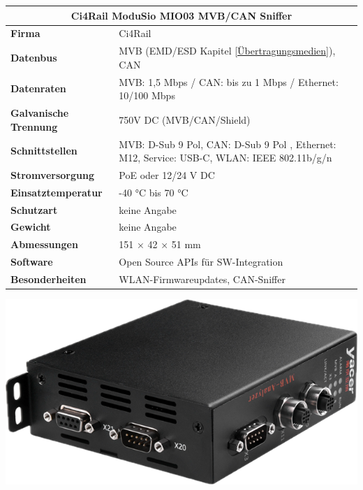 \begin{minipage}{0.57\textwidth}
  \begin{tabular}{|m{3cm}|m{4.5cm}|}
   \hline
   \multicolumn{2}{|c|}{\textbf{Ci4Rail ModuSio MIO03 MVB/CAN Sniffer}} \\ \hline
    \textbf{Firma} & Ci4Rail \\ \hline
    \textbf{Datenbus} & MVB (EMD/ESD Kapitel \ref{Übertragungsmedien}), CAN \\ \hline
    \textbf{Datenraten} & MVB: 1,5 Mbps / CAN: bis zu 1 Mbps / Ethernet: 10/100 Mbps \\ \hline
    \textbf{Galvanische \mbox{Trennung}} & 750V DC (MVB/CAN/Shield) \\ \hline
    \textbf{Schnittstellen} & MVB: D-Sub 9 Pol, CAN: D-Sub 9 Pol , Ethernet: M12, Service: USB-C, WLAN: IEEE 802.11b/g/n  \\ \hline
    \textbf{Stromversorgung} & PoE oder 12/24 V DC \\ \hline
    \textbf{Einsatztemperatur} & -40 °C bis 70 °C \\ \hline
    \textbf{Schutzart} & keine Angabe \\ \hline
    \textbf{Gewicht} & keine Angabe \\ \hline
    \textbf{Abmessungen} & 151 × 42 × 51 mm \\ \hline
    \textbf{Software} &  Open Source APIs für SW-Integration \\ \hline
    \textbf{Besonderheiten} & WLAN-Firmwareupdates, CAN-Sniffer \\ \hline
  \end{tabular}

\end{minipage}
\begin{minipage}{0.4\textwidth}
  \includegraphics[width=1\linewidth]{Figures/Chap3/Konkurenz/Yacer.png}
  \label{fig:YacerAnalyzer}
\end{minipage}
